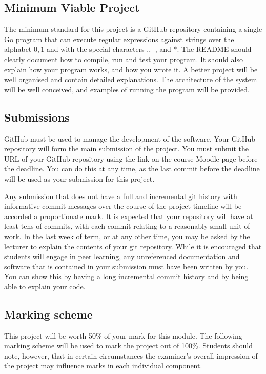 \documentclass[12pt, a4paper]{article}
\begin{document}
\subsection*{Minimum Viable Project}
The minimum standard for this project is a GitHub repository containing a single Go program that can execute regular expressions against strings over the alphabet ${0,1}$ and with the special characters $.$, $|$, and $*$.
The README should clearly document how to compile, run and test your program.
It should also explain how your program works, and how you wrote it.
A better project will be well organised and contain detailed explanations.
The architecture of the system will be well conceived, and examples of running the program will be provided.


\subsection*{Submissions}
GitHub must be used to manage the development of the software.
Your GitHub repository will form the main submission of the project.
You must submit the URL of your GitHub repository using the link on the course Moodle page before the deadline.
You can do this at any time, as the last commit before the deadline will be used as your submission for this project.

Any submission that does not have a full and incremental git history with informative commit messages over the course of the project timeline will be accorded a proportionate mark.
It is expected that your repository will have at least tens of commits, with each commit relating to a reasonably small unit of work.
In the last week of term, or at any other time, you may be asked by the lecturer to explain the contents of your git repository.
While it is encouraged that students will engage in peer learning, any unreferenced documentation and software that is contained in your submission must have been written by you.
You can show this by having a long incremental commit history and by being able to explain your code.

\subsection*{Marking scheme}
This project will be worth 50\% of your mark for this module.
The following marking scheme will be used to mark the project out of 100\%.
Students should note, however, that in certain circumstances the examiner's overall impression of the project may influence marks in each individual component.
\end{document}
